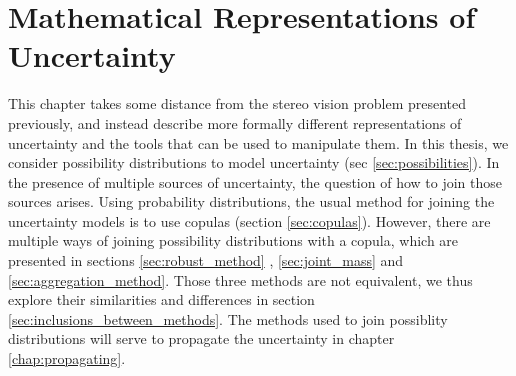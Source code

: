 \chapter{Mathematical Representations of Uncertainty}\label{chap:representation_of_uncertainty}

This chapter takes some distance from the stereo vision problem presented previously, and instead describe more formally different representations of uncertainty and the tools that can be used to manipulate them. In this thesis, we consider possibility distributions to model uncertainty (sec \ref{sec:possibilities}). In the presence of multiple sources of uncertainty, the question of how to join those sources arises. Using probability distributions, the usual method for joining the uncertainty models is to use copulas (section \ref{sec:copulas}). However, there are multiple ways of joining possibility distributions with a copula, which are presented in sections \ref{sec:robust_method} , \ref{sec:joint_mass} and \ref{sec:aggregation_method}. Those three methods are not equivalent, we thus explore their similarities and differences in section \ref{sec:inclusions_between_methods}. The methods used to join possiblity distributions will serve to propagate the uncertainty in chapter \ref{chap:propagating}. 

